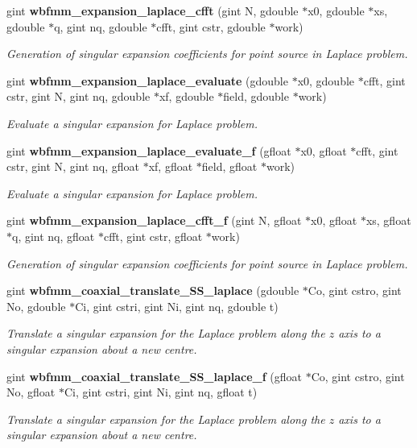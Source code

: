\begin{DoxyCompactItemize}
gint {\bf wbfmm\+\_\+expansion\+\_\+laplace\+\_\+cfft} (gint N, gdouble $\ast$x0, gdouble $\ast$xs, gdouble $\ast$q, gint nq, gdouble $\ast$cfft, gint cstr, gdouble $\ast$work)
\begin{DoxyCompactList}\small\item\em Generation of singular expansion coefficients for point source in Laplace problem. \end{DoxyCompactList}\item 
gint {\bf wbfmm\+\_\+expansion\+\_\+laplace\+\_\+evaluate} (gdouble $\ast$x0, gdouble $\ast$cfft, gint cstr, gint N, gint nq, gdouble $\ast$xf, gdouble $\ast$field, gdouble $\ast$work)
\begin{DoxyCompactList}\small\item\em Evaluate a singular expansion for Laplace problem. \end{DoxyCompactList}\item 
gint {\bf wbfmm\+\_\+expansion\+\_\+laplace\+\_\+evaluate\+\_\+f} (gfloat $\ast$x0, gfloat $\ast$cfft, gint cstr, gint N, gint nq, gfloat $\ast$xf, gfloat $\ast$field, gfloat $\ast$work)
\begin{DoxyCompactList}\small\item\em Evaluate a singular expansion for Laplace problem. \end{DoxyCompactList}\item 
gint {\bf wbfmm\+\_\+expansion\+\_\+laplace\+\_\+cfft\+\_\+f} (gint N, gfloat $\ast$x0, gfloat $\ast$xs, gfloat $\ast$q, gint nq, gfloat $\ast$cfft, gint cstr, gfloat $\ast$work)
\begin{DoxyCompactList}\small\item\em Generation of singular expansion coefficients for point source in Laplace problem. \end{DoxyCompactList}\item 
gint {\bf wbfmm\+\_\+coaxial\+\_\+translate\+\_\+\+S\+S\+\_\+laplace} (gdouble $\ast$Co, gint cstro, gint No, gdouble $\ast$Ci, gint cstri, gint Ni, gint nq, gdouble t)
\begin{DoxyCompactList}\small\item\em Translate a singular expansion for the Laplace problem along the $z$ axis to a singular expansion about a new centre. \end{DoxyCompactList}\item 
gint {\bf wbfmm\+\_\+coaxial\+\_\+translate\+\_\+\+S\+S\+\_\+laplace\+\_\+f} (gfloat $\ast$Co, gint cstro, gint No, gfloat $\ast$Ci, gint cstri, gint Ni, gint nq, gfloat t)
\begin{DoxyCompactList}\small\item\em Translate a singular expansion for the Laplace problem along the $z$ axis to a singular expansion about a new centre. \end{DoxyCompactList}\item 

\end{DoxyCompactItemize}
